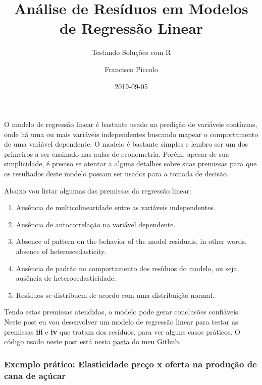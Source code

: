 \documentclass[
  11pt,
  a4paper,
]{article}
\title{Análise de Resíduos em Modelos de Regressão Linear}
\subtitle{Testando Soluções com R}
\author{Francisco Piccolo}
\date{2019-09-05}
\begin{document}
\maketitle

O modelo de regressão linear é bastante usado na predição de variáveis contínuas, onde há uma ou mais variáveis independentes buscando mapear o comportamento de uma variável dependente. O modelo é bastante simples e lembro ser um dos primeiros a ser ensinado nas aulas de econometria. Porém, apesar de sua simplicidade, é preciso se atentar a alguns detalhes sobre suas premissas para que os resultados deste modelo possam ser usados para a tomada de decisão.

Abaixo vou listar algumas das premissas da regressão linear:

\begin{enumerate}
\def\labelenumi{\roman{enumi})}
\item
  Ausência de multicolinearidade entre as variáveis independentes.
\item
  Ausência de autocorrelação na variável dependente.
\item
  Absence of pattern on the behavior of the model residuals, in other words, absence of heteroscedasticity.
\item
  Ausência de padrão no comportamento dos resíduos do modelo, ou seja, ausência de heterocedasticidade.
\item
  Resíduos se distribuem de acordo com uma distribuição normal.
\end{enumerate}

Tendo estas premissas atendidas, o modelo pode gerar conclusões confiáveis. Neste post eu vou desenvolver um modelo de regressão linear para testar as premissas \textbf{iii} e \textbf{iv} que tratam dos resíduos, para ver alguns casos práticos. O código usado neste post está nesta \href{https://github.com/FranciscoPiccolo/franciscopiccolo.github.io/blob/master/02.Posts_pdf/02.residual_analysis_in_econometric_models_20190905/article.Rmd}{pasta} do meu Github.

\hypertarget{exemplo-pruxe1tico-elasticidade-preuxe7o-x-oferta-na-produuxe7uxe3o-de-cana-de-auxe7uxfacar}{%
\subsubsection{Exemplo prático: Elasticidade preço x oferta na produção de cana de açúcar}\label{exemplo-pruxe1tico-elasticidade-preuxe7o-x-oferta-na-produuxe7uxe3o-de-cana-de-auxe7uxfacar}}
\end{document}
